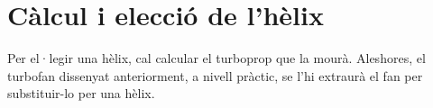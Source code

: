 \section{Càlcul i elecció de l'hèlix}
Per el·legir una hèlix, cal calcular el turboprop que la mourà. Aleshores, el turbofan dissenyat anteriorment, a nivell pràctic, se l'hi extraurà el fan per substituir-lo per una hèlix. 